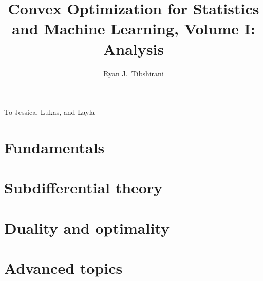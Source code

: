 \documentclass[oneside]{gsm-l} %
\numberwithin{section}{chapter}
\numberwithin{equation}{chapter}
\numberwithin{figure}{chapter}
\begin{document}
\frontmatter

\title{Convex Optimization for Statistics and Machine Learning, Volume I:
  Analysis} 
\author{Ryan J.\ Tibshirani}


\maketitle

\cleardoublepage
\thispagestyle{empty}
\vspace*{13.5pc}
\begin{center}
To Jessica, Lukas, and Layla
\end{center}
\cleardoublepage

\setcounter{page}{7} %
\setcounter{tocdepth}{1} %
\tableofcontents






\mainmatter


\part{Fundamentals}




\part{Subdifferential theory}


 

\part{Duality and optimality}




\part{Advanced topics}
 

\end{document}
